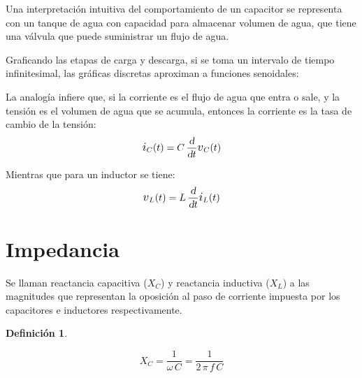 \documentclass[a5paper,12pt,twoside]{book}
\newtheorem{defn}{{Definición}}[chapter]
\begin{document}
\begin{center}
    \def\svgwidth{0.6\linewidth}
    
\end{center}

Una interpretación intuitiva del comportamiento de un capacitor se representa con un tanque de agua con capacidad para almacenar volumen de agua, que tiene una válvula que puede suministrar un flujo de agua.

\begin{center}
    \def\svgwidth{0.9\linewidth}
    
\end{center}

Graficando las etapas de carga y descarga, si se toma un intervalo de tiempo infinitesimal, las gráficas discretas aproximan a funciones senoidales:

\begin{center}
    \def\svgwidth{0.8\linewidth}
    
\end{center}

La analogía infiere que, si la corriente es el flujo de agua que entra o sale, y la tensión es el volumen de agua que se acumula, entonces la corriente es la tasa de cambio de la tensión:
\begin{equation*}
    \current_C(t) = C \, \frac{\dif}{\dif t} \voltage_C(t)
\end{equation*}

Mientras que para un inductor se tiene:
\begin{equation*}
    \voltage_L(t) = L \, \frac{\dif}{\dif t} \current_L(t)
\end{equation*}


\section{Impedancia}

Se llaman reactancia capacitiva ($X_C$) y reactancia inductiva ($X_L$) a las magnitudes que representan la oposición al paso de corriente impuesta por los capacitores e inductores respectivamente.

\begin{mdframed}[style=MyFrame1]
    \begin{defn}
    \end{defn}
    \begin{equation*}
        X_C = \frac{1}{\omega \, C} = \frac{1}{2 \, \pi \, f \, C}
    \end{equation*}
\end{mdframed}
\end{document}
